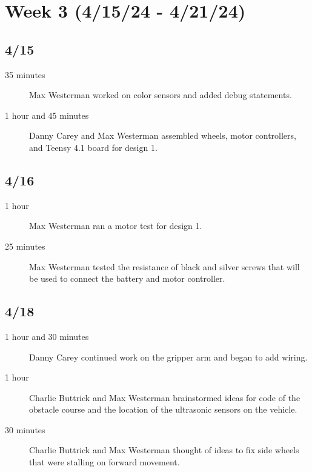\documentclass[11pt]{report}
\begin{document}
\section{Week 3 (4/15/24 - 4/21/24)}
\begin{adjustwidth}{0.5cm}{0cm}
\subsection*{4/15}
\begin{greylineformat}
\begin{description}
    \item [35 minutes] Max Westerman worked on color sensors and added debug statements. 
    \item [1 hour and 45 minutes] Danny Carey and Max Westerman assembled wheels, motor controllers, and Teensy 4.1 board for design 1. 
\end{description}\end{greylineformat}

\vspace{-2.1em}\subsection*{4/16}
\begin{greylineformat}
\begin{description}
    \item [1 hour] Max Westerman ran a motor test for design 1. 
    \item [25 minutes] Max Westerman tested the resistance of black and silver screws that will be used to connect the battery and motor controller. 
\end{description}\end{greylineformat}

\vspace{-2.1em}\subsection*{4/18}
\begin{greylineformat}
\begin{description}
    \item [1 hour and 30 minutes] Danny Carey continued work on the gripper arm and began to add wiring. 
    \item [1 hour] Charlie Buttrick and Max Westerman brainstormed ideas for code of the obstacle course and the location of the ultrasonic sensors on the vehicle. 
    \item [30 minutes] Charlie Buttrick and Max Westerman thought of ideas to fix side wheels that were stalling on forward movement. 
\end{description}\end{greylineformat}


\end{adjustwidth}
\end{document}
